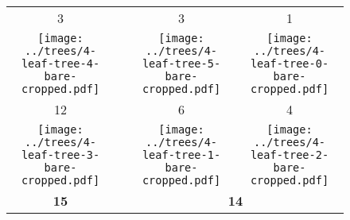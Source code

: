 \documentclass[border=10pt,varwidth=30cm]{standalone}
\newcommand{\pltwidth}{0.1}
\begin{document}
\begin{figure}
    \setlength\arrayrulewidth{2pt}
    \centering
    \begin{tabular}{@{}cccc@{}}
        3 & & 3 & 1 \\
        \texttt{[image: ../trees/4-leaf-tree-4-bare-cropped.pdf]}
        & &
        \texttt{[image: ../trees/4-leaf-tree-5-bare-cropped.pdf]}
        &
        \texttt{[image: ../trees/4-leaf-tree-0-bare-cropped.pdf]} \\[1ex]
        12 & & 6 & 4 \\
        \texttt{[image: ../trees/4-leaf-tree-3-bare-cropped.pdf]}
        & &
        \texttt{[image: ../trees/4-leaf-tree-1-bare-cropped.pdf]}
        &
        \texttt{[image: ../trees/4-leaf-tree-2-bare-cropped.pdf]} \\
        {\Large \textbf{15}} & & \multicolumn{2}{c}{\Large \textbf{14}} \\
    \end{tabular}
\end{figure}
\end{document}
